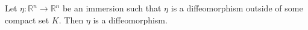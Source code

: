 Let $\eta: \mathbb{R}^n \to \mathbb{R}^n$ be an immersion such that $\eta$ is a diffeomorphism outside of some compact set $K$. Then $\eta$ is a diffeomorphism.
